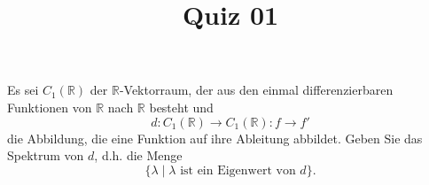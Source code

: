 \documentclass{article}
\title{Quiz 01}
\theoremstyle{plain}
\theoremstyle{definition}
\theoremstyle{remakr}
\begin{document}
Es sei $C_1\left( \mathbb{R} \right)$ der $\mathbb{R}$-Vektorraum, der aus den einmal differenzierbaren Funktionen von $\mathbb{R}$ nach $\mathbb{R}$ besteht und
\[
d: C_1\left( \mathbb{R} \right) \rightarrow C_1\left( \mathbb{R} \right): f \rightarrow f'
\]
die Abbildung, die eine Funktion auf ihre Ableitung abbildet. Geben Sie das Spektrum von $d$, d.h. die Menge
\[
\{ \lambda \mid \lambda \text{ ist ein Eigenwert von } d \}.
\]
\end{document}
